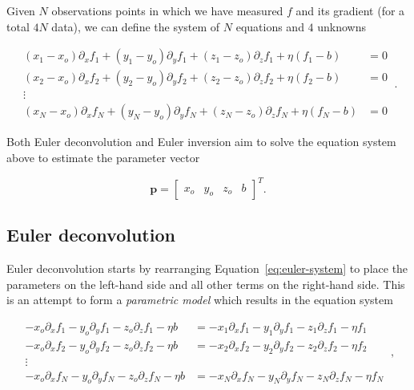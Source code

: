 Given $N$ observations points in which we have measured $f$ and its gradient
(for a total $4N$ data), we can define the system of $N$ equations and $4$
unknowns

\begin{equation}
  \begin{aligned}
    (x_1-x_o)\partial_x f_1 + (y_1-y_o)\partial_y f_1 + (z_1-z_o)\partial_z f_1 + \eta(f_1-b) &= 0
    \\
    (x_2-x_o)\partial_x f_2 + (y_2-y_o)\partial_y f_2 + (z_2-z_o)\partial_z f_2 + \eta(f_2-b) &= 0
    \\
    \vdots
    \\
    (x_N-x_o)\partial_x f_N + (y_N-y_o)\partial_y f_N + (z_N-z_o)\partial_z f_N + \eta(f_N-b) &= 0
  \end{aligned}
  \ .
  \label{eq:euler-system}
\end{equation}

\noindent
Both Euler deconvolution and Euler inversion aim to solve the equation system
above to estimate the parameter vector

\begin{equation}
  \mathbf{p} = \begin{bmatrix}x_o & y_o & z_o & b \end{bmatrix}^T.
  \label{eq:p}
\end{equation}


\subsection{Euler deconvolution}

Euler deconvolution starts by rearranging Equation~\ref{eq:euler-system} to
place the parameters on the left-hand side and all other terms on the
right-hand side. This is an attempt to form a \textit{parametric model} which
results in the equation system

\begin{equation}
  \begin{aligned}
  -x_o\partial_x f_1 - y_o\partial_y f_1 - z_o\partial_z f_1 - \eta b &= -x_1\partial_x f_1 - y_1\partial_y f_1 - z_1\partial_z f_1 - \eta f_1
  \\
  -x_o\partial_x f_2 - y_o\partial_y f_2 - z_o\partial_z f_2 - \eta b &= -x_2\partial_x f_2 - y_2\partial_y f_2 - z_2\partial_z f_2 - \eta f_2
  \\
  \vdots
  \\
  -x_o\partial_x f_N - y_o\partial_y f_N - z_o\partial_z f_N - \eta b &= -x_N\partial_x f_N - y_N\partial_y f_N - z_N\partial_z f_N - \eta f_N
  \end{aligned}
  \ ,
\end{equation}

